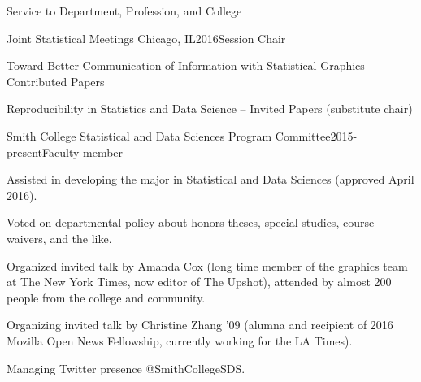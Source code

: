 \documentclass{resume} %
\begin{document}
\begin{rSection}{Service to Department, Profession, and College}
\begin{rSubsection}{Joint Statistical Meetings}{ Chicago, IL}{2016}{Session Chair}
\item Toward Better Communication of Information with Statistical Graphics -- Contributed Papers
\item Reproducibility in Statistics and Data Science -- Invited Papers (substitute chair)
\end{rSubsection}


\begin{rSubsection}{Smith College Statistical and Data Sciences Program Committee}{}{2015-present}{Faculty member}
\item Assisted in developing the major in Statistical and Data Sciences (approved April 2016).
\item Voted on departmental policy about honors theses, special studies, course waivers, and the like. 
\item Organized invited talk by Amanda Cox (long time member of the graphics team at The New York Times, now editor of The Upshot), attended by almost 200 people from the college and community. 
\item Organizing invited talk by Christine Zhang '09 (alumna and recipient of 2016 Mozilla Open News Fellowship, currently working for the LA Times). 
\item Managing Twitter presence @SmithCollegeSDS. 
\end{rSubsection}


\end{rSection}
\end{document}
